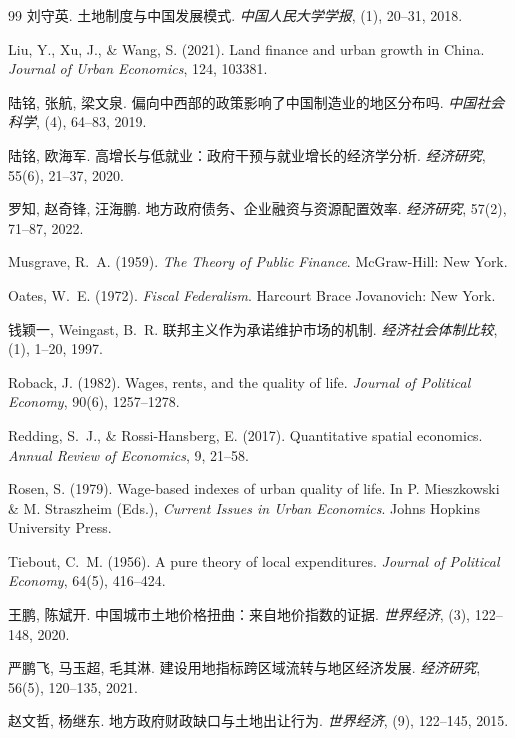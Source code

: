 \documentclass[UTF8,a4paper,12pt]{ctexart}
\theoremstyle{plain}
\theoremstyle{definition}
\theoremstyle{remark}
\begin{document}
\begin{thebibliography}{99}
刘守英.
土地制度与中国发展模式.
\textit{中国人民大学学报}, (1), 20--31, 2018.

Liu, Y., Xu, J., \& Wang, S. (2021).
Land finance and urban growth in China.
\textit{Journal of Urban Economics}, 124, 103381.

陆铭, 张航, 梁文泉.
偏向中西部的政策影响了中国制造业的地区分布吗.
\textit{中国社会科学}, (4), 64--83, 2019.

陆铭, 欧海军.
高增长与低就业：政府干预与就业增长的经济学分析.
\textit{经济研究}, 55(6), 21--37, 2020.

罗知, 赵奇锋, 汪海鹏.
地方政府债务、企业融资与资源配置效率.
\textit{经济研究}, 57(2), 71--87, 2022.

Musgrave, R.~A. (1959).
\textit{The Theory of Public Finance}.
McGraw-Hill: New York.

Oates, W.~E. (1972).
\textit{Fiscal Federalism}.
Harcourt Brace Jovanovich: New York.

钱颖一, Weingast, B.~R.
联邦主义作为承诺维护市场的机制.
\textit{经济社会体制比较}, (1), 1--20, 1997.

Roback, J. (1982).
Wages, rents, and the quality of life.
\textit{Journal of Political Economy}, 90(6), 1257--1278.

Redding, S.~J., \& Rossi-Hansberg, E. (2017).
Quantitative spatial economics.
\textit{Annual Review of Economics}, 9, 21--58.

Rosen, S. (1979).
Wage-based indexes of urban quality of life.
In P. Mieszkowski \& M. Straszheim (Eds.),
\textit{Current Issues in Urban Economics}.
Johns Hopkins University Press.

Tiebout, C.~M. (1956).
A pure theory of local expenditures.
\textit{Journal of Political Economy}, 64(5), 416--424.

王鹏, 陈斌开.
中国城市土地价格扭曲：来自地价指数的证据.
\textit{世界经济}, (3), 122--148, 2020.

严鹏飞, 马玉超, 毛其淋.
建设用地指标跨区域流转与地区经济发展.
\textit{经济研究}, 56(5), 120--135, 2021.

赵文哲, 杨继东.
地方政府财政缺口与土地出让行为.
\textit{世界经济}, (9), 122--145, 2015.

\end{thebibliography}
\end{document}
